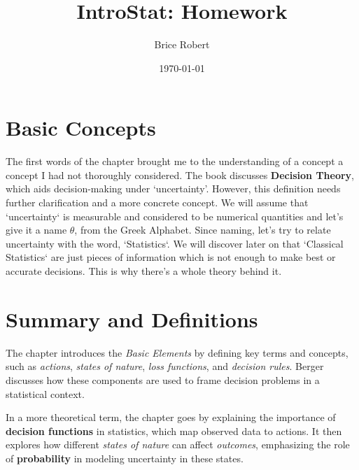 \documentclass{article} %
\title{IntroStat: Homework} %
\author{Brice Robert} %
\date{\today} %
\begin{document}
    \maketitle %

\vspace{.4cm}
    
    \section{Basic Concepts} %
    
    The first words of the chapter brought me to the understanding of a concept a concept I had not thoroughly considered. The book discusses \textbf{Decision Theory}, which aids decision-making under ‘uncertainty’. However, this definition needs further clarification and a more concrete concept. We will assume that `uncertainty` is measurable and considered to be numerical quantities and let's give it a name $\theta$, from the Greek Alphabet. Since naming, let's try to relate uncertainty with the word, `Statistics`. We will discover later on that `Classical Statistics` are just pieces of information which is not enough to make best or accurate decisions. This is why there's a whole theory behind it. 

\vspace{.3cm}

    \section{Summary and Definitions} %

    The chapter introduces the \textit{Basic Elements} by defining key terms and concepts, such as \textit{actions}, \textit{states of nature}, \textit{loss functions}, and \textit{decision rules}. Berger discusses how these components are used to frame decision problems in a statistical context.

\vspace{.1cm}

In a more theoretical term, the chapter goes by explaining the importance of \textbf{decision functions} in statistics, which map observed data to actions. It then explores how different \textit{states of nature} can affect \textit{outcomes}, emphasizing the role of \textbf{probability} in modeling uncertainty in these states.
\end{document}
